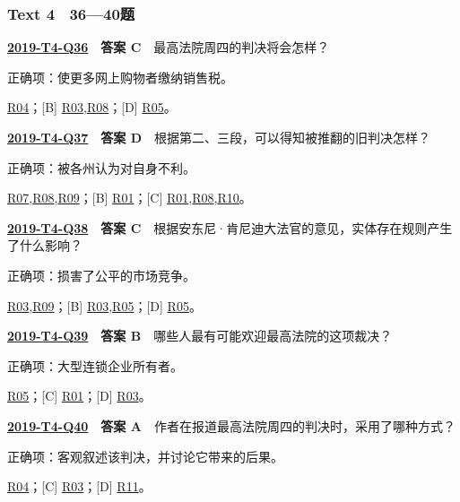 \documentclass[11pt,a4paper]{article}
\begin{document}
\subsubsection{Text 4　36—40题}
\label{idx-2019-T4-Q36}
\noindent\textbf{\href{https://zj139.github.io/math-notes/english/31a197359605526c06bc0605/\#q36}{2019-T4-Q36}　答案 C}　最高法院周四的判决将会怎样？\par\nopagebreak
\noindent 正确项：使更多网上购物者缴纳销售税。\par\nopagebreak
\noindent [A] \hyperref[cat-R04]{R04}；[B] \hyperref[cat-R03]{R03},\hyperref[cat-R08]{R08}；[D] \hyperref[cat-R05]{R05}。
\par\smallskip
{}\label{idx-2019-T4-Q37}
\noindent\textbf{\href{https://zj139.github.io/math-notes/english/31a197359605526c06bc0605/\#q37}{2019-T4-Q37}　答案 D}　根据第二、三段，可以得知被推翻的旧判决怎样？\par\nopagebreak
\noindent 正确项：被各州认为对自身不利。\par\nopagebreak
\noindent [A] \hyperref[cat-R07]{R07},\hyperref[cat-R08]{R08},\hyperref[cat-R09]{R09}；[B] \hyperref[cat-R01]{R01}；[C] \hyperref[cat-R01]{R01},\hyperref[cat-R08]{R08},\hyperref[cat-R10]{R10}。
\par\smallskip
{}\label{idx-2019-T4-Q38}
\noindent\textbf{\href{https://zj139.github.io/math-notes/english/31a197359605526c06bc0605/\#q38}{2019-T4-Q38}　答案 C}　根据安东尼·肯尼迪大法官的意见，实体存在规则产生了什么影响？\par\nopagebreak
\noindent 正确项：损害了公平的市场竞争。\par\nopagebreak
\noindent [A] \hyperref[cat-R03]{R03},\hyperref[cat-R09]{R09}；[B] \hyperref[cat-R03]{R03},\hyperref[cat-R05]{R05}；[D] \hyperref[cat-R05]{R05}。
\par\smallskip
{}\label{idx-2019-T4-Q39}
\noindent\textbf{\href{https://zj139.github.io/math-notes/english/31a197359605526c06bc0605/\#q39}{2019-T4-Q39}　答案 B}　哪些人最有可能欢迎最高法院的这项裁决？\par\nopagebreak
\noindent 正确项：大型连锁企业所有者。\par\nopagebreak
\noindent [A] \hyperref[cat-R05]{R05}；[C] \hyperref[cat-R01]{R01}；[D] \hyperref[cat-R03]{R03}。
\par\smallskip
{}\label{idx-2019-T4-Q40}
\noindent\textbf{\href{https://zj139.github.io/math-notes/english/31a197359605526c06bc0605/\#q40}{2019-T4-Q40}　答案 A}　作者在报道最高法院周四的判决时，采用了哪种方式？\par\nopagebreak
\noindent 正确项：客观叙述该判决，并讨论它带来的后果。\par\nopagebreak
\noindent [B] \hyperref[cat-R04]{R04}；[C] \hyperref[cat-R03]{R03}；[D] \hyperref[cat-R11]{R11}。
\par\smallskip
\clearpage\setlength{\parskip}{1pt}
\end{document}
